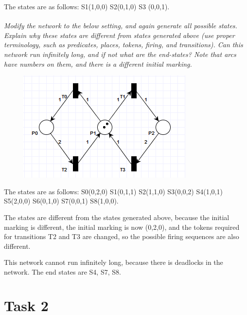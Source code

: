 \documentclass[letterpaper]{article}
\begin{document}
The states are as follows: S1(1,0,0) S2(0,1,0) S3 (0,0,1). \\ \\

\textit{Modify the network to the below setting, and again generate all possible states. Explain why these states are different from states generated above (use proper terminology, such as predicates, places, tokens, firing, and transitions). Can this network run infinitely long, and if not what are the end-states?
 Note that arcs have numbers on them, and there is a different initial marking.
}

\begin{figure}[H]
 \centering
 \includegraphics[width=\textwidth]{image2.png}
\end{figure}

The states are as follows: S0(0,2,0) S1(0,1,1) S2(1,1,0) S3(0,0,2) S4(1,0,1)
S5(2,0,0) S6(0,1,0) S7(0,0,1) S8(1,0,0).

The states are different from the states generated above, because the initial
marking is different, the initial marking is now (0,2,0), and the tokens
required for transitions T2 and T3 are changed, so the possible firing sequences
are also different.

This network cannot run infinitely long, because there is deadlocks in the network.
The end states are S4, S7, S8.



\section{Task 2}
\end{document}
